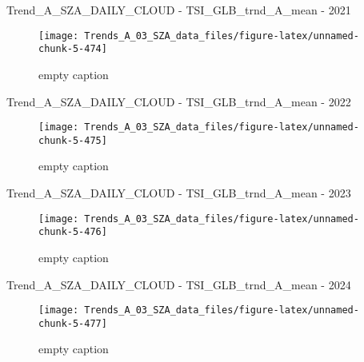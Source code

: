 \documentclass[
  10pt,
  a4paper,oneside]{article}
\begin{document}
Trend\_A\_SZA\_DAILY\_CLOUD - TSI\_GLB\_trnd\_A\_mean - 2021

\begin{figure}[!ht]

{\centering \texttt{[image: Trends\_A\_03\_SZA\_data\_files/figure-latex/unnamed-chunk-5-474]} 

}

\caption{ empty caption }\label{fig:unnamed-chunk-5-474}
\end{figure}

Trend\_A\_SZA\_DAILY\_CLOUD - TSI\_GLB\_trnd\_A\_mean - 2022

\begin{figure}[!ht]

{\centering \texttt{[image: Trends\_A\_03\_SZA\_data\_files/figure-latex/unnamed-chunk-5-475]} 

}

\caption{ empty caption }\label{fig:unnamed-chunk-5-475}
\end{figure}

Trend\_A\_SZA\_DAILY\_CLOUD - TSI\_GLB\_trnd\_A\_mean - 2023

\begin{figure}[!ht]

{\centering \texttt{[image: Trends\_A\_03\_SZA\_data\_files/figure-latex/unnamed-chunk-5-476]} 

}

\caption{ empty caption }\label{fig:unnamed-chunk-5-476}
\end{figure}

Trend\_A\_SZA\_DAILY\_CLOUD - TSI\_GLB\_trnd\_A\_mean - 2024

\begin{figure}[!ht]

{\centering \texttt{[image: Trends\_A\_03\_SZA\_data\_files/figure-latex/unnamed-chunk-5-477]} 

}

\caption{ empty caption }\label{fig:unnamed-chunk-5-477}
\end{figure}
\end{document}
